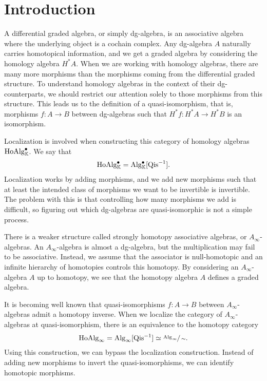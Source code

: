 \documentclass[../thesis.tex]{subfiles}
\begin{document}
    \newpage
    
    \chapter*{Introduction}

        A differential graded algebra, or simply dg-algebra, is an associative algebra where the underlying object is a cochain complex. Any dg-algebra $A$ naturally carries homotopical information, and we get a graded algebra by considering the homology algebra $H^*A$. When we are working with homology algebras, there are many more morphisms than the morphisms coming from the differential graded structure. To understand homology algebras in the context of their dg-counterparts, we should restrict our attention solely to those morphisms from this structure. This leads us to the definition of a quasi-isomorphism, that is, morphisms $f:A\rightarrow B$ between dg-algebras such that $H^*f:H^*A\rightarrow H^*B$ is an isomorphism.

        Localization is involved when constructing this category of homology algebras $\tt{HoAlg}_\mathbb{K}^\bullet$. We say that
        \begin{align*}
            \tt{HoAlg}_\mathbb{K}^\bullet = \tt{Alg}_\mathbb{K}^\bullet[\tt{Qis}^{-1}]\tt{.}
        \end{align*}
        Localization works by adding morphisms, and we add new morphisms such that at least the intended class of morphisms we want to be invertible is invertible. The problem with this is that controlling how many morphisms we add is difficult, so figuring out which dg-algebras are quasi-isomorphic is not a simple process.

        There is a weaker structure called strongly homotopy associative algebras, or $A_\infty$-algebras. An $A_\infty$-algebra is almost a dg-algebra, but the multiplication may fail to be associative. Instead, we assume that the associator is null-homotopic and an infinite hierarchy of homotopies controls this homotopy. By considering an $A_\infty$-algebra $A$ up to homotopy, we see that the homotopy algebra $A$ defines a graded algebra.

        It is becoming well known that quasi-isomorphisms $f:A\rightarrow B$ between $A_\infty$-algebras admit a homotopy inverse. When we localize the category of $A_\infty$-algebras at quasi-isomorphism, there is an equivalence to the homotopy category
        \begin{align*}
            \tt{HoAlg}_\infty = \tt{Alg}_\infty[\tt{Qis}^{-1}] \simeq \sfrac{\tt{Alg}_\infty}{\sim}\tt{.}
        \end{align*}
        Using this construction, we can bypass the localization construction. Instead of adding new morphisms to invert the quasi-isomorphisms, we can identify homotopic morphisms.
\end{document}
